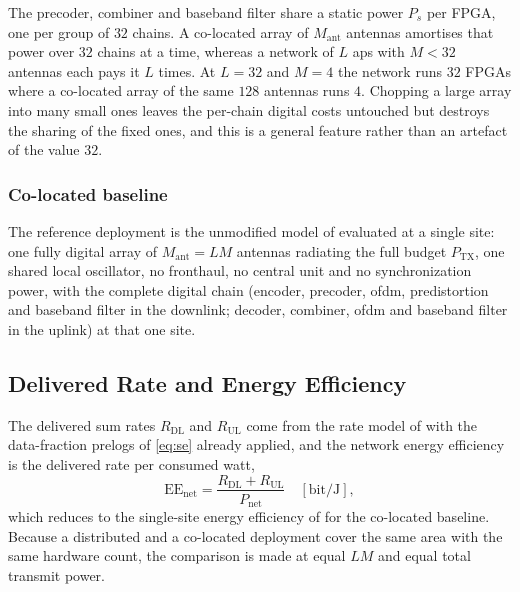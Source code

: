 \begin{remark}
\label{rem:fpga}
The precoder, combiner and baseband filter share a static power $P_{s}$ per
FPGA, one per group of $32$ chains. A co-located array of $M_{\mathrm{ant}}$
antennas amortises that power over $32$ chains at a time, whereas a network of
$L$ \glspl{ap} with $M<32$ antennas each pays it $L$ times. At $L=32$ and $M=4$
the network runs $32$ FPGAs where a co-located array of the same $128$ antennas
runs $4$. Chopping a large array into many small ones leaves the per-chain
digital costs untouched but destroys the sharing of the fixed ones, and this is a
general feature rather than an artefact of the value $32$.
\end{remark}

\subsubsection{Co-located baseline}
The reference deployment is the unmodified model of \cite{peschiera2026fr3}
evaluated at a single site: one fully digital array of $M_{\mathrm{ant}}=LM$
antennas radiating the full budget $P_{\mathrm{TX}}$, one shared local
oscillator, no fronthaul, no central unit and no synchronization power, with the
complete digital chain (encoder, precoder, \gls{ofdm}, predistortion and
baseband filter in the downlink; decoder, combiner, \gls{ofdm} and baseband
filter in the uplink) at that one site. 

\subsection{Delivered Rate and Energy Efficiency}
\label{ssec:ee}

The delivered sum rates $R_{\mathrm{DL}}$ and $R_{\mathrm{UL}}$ come from the
rate model of  with the data-fraction prelogs of
\eqref{eq:se} already applied, and the network energy efficiency is the
delivered rate per consumed watt,
\begin{equation}
\label{eq:ee_net}
\mathrm{EE}_{\mathrm{net}} =
\frac{R_{\mathrm{DL}} + R_{\mathrm{UL}}}{P_{\mathrm{net}}}
\quad [\mathrm{bit/J}],
\end{equation}
which reduces to the single-site energy efficiency of \cite{peschiera2026fr3}
for the co-located baseline. Because a distributed and a co-located deployment
cover the same area with the same hardware count, the comparison is made at equal
$LM$ and equal total transmit power.

